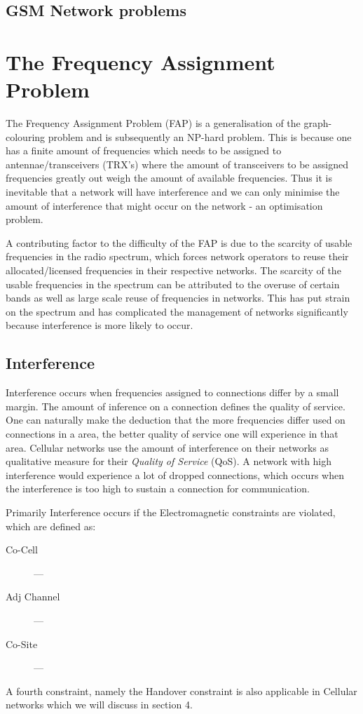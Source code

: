\subsection{GSM Network problems}
\section{The Frequency Assignment Problem}
The Frequency Assignment Problem (FAP) is a generalisation of the graph-colouring problem and is subsequently an NP-hard problem. This is because one has a finite amount of frequencies which needs to be 
assigned to antennae/transceivers (TRX's)  where the amount of transceivers to be assigned frequencies greatly out weigh the amount of available frequencies. Thus it is inevitable that a network will 
have interference and we can only minimise the amount of interference that might occur on the network - an optimisation problem. 

A contributing factor to the difficulty of the FAP is due to the scarcity of usable frequencies in the radio spectrum, which forces network operators to reuse their allocated/licensed frequencies in their respective networks. The scarcity of the usable frequencies in the spectrum can be attributed to the overuse of certain bands as well as large scale reuse of frequencies in networks. This has put strain on the spectrum and has complicated the management of networks significantly because interference is more likely to occur.

\subsection{Interference}
Interference occurs when frequencies assigned to connections differ by a small margin. The amount of inference on a connection defines the quality of service. One can naturally make the deduction that 
the more frequencies differ used on connections in a area, the better quality of service one will experience in that area. Cellular networks use the amount of interference on their networks as 
qualitative measure for their \emph{Quality of Service} (QoS). A network with high interference would experience a lot of dropped connections, which occurs when the interference is too high to sustain a connection for communication.

Primarily Interference occurs if the Electromagnetic constraints are violated, which are defined as:
\begin{description}
\item[Co-Cell] ---
\item[Adj Channel] ---
\item[Co-Site] ---
\end{description}
A fourth constraint, namely the Handover constraint is also applicable in Cellular networks which we will discuss in section 4.

